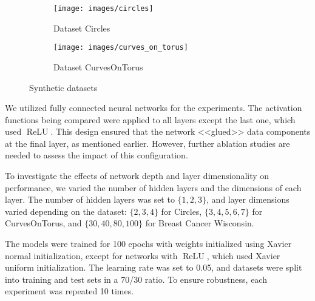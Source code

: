 \documentclass{esannV2}
\DeclareMathOperator{\relu}{\mathrm{ReLU}}
\begin{document}
\begin{figure}[!htb]
  \centering
  \begin{subfigure}[b]{0.45\linewidth}
    \centering
    \texttt{[image: images/circles]}
    \caption{Dataset Circles}
  \end{subfigure}
  \begin{subfigure}[b]{0.45\linewidth}
    \centering
    \texttt{[image: images/curves\_on\_torus]}
    \caption{Dataset CurvesOnTorus}
  \end{subfigure}
  \caption{Synthetic datasets}
  \label{fig:data_manifolds}
\end{figure}

We utilized fully connected neural networks for the experiments. The activation functions being compared were applied to all layers except the last one, which used \( \relu \). This design ensured that the network <<glued>> data components at the final layer, as mentioned earlier. However, further ablation studies are needed to assess the impact of this configuration.

To investigate the effects of network depth and layer dimensionality on performance, we varied the number of hidden layers and the dimensions of each layer. The number of hidden layers was set to $\{1, 2, 3\}$, and layer dimensions varied depending on the dataset: $\{2, 3, 4\}$ for Circles, $\{3, 4, 5, 6, 7\}$ for CurvesOnTorus, and $\{30, 40, 80, 100\}$ for Breast Cancer Wisconsin.

The models were trained for 100 epochs with weights initialized using Xavier normal initialization, except for networks with \( \relu \), which used Xavier uniform initialization. The learning rate was set to 0.05, and datasets were split into training and test sets in a 70/30 ratio. To ensure robustness, each experiment was repeated 10 times.
\end{document}
